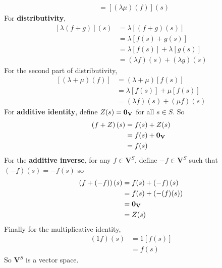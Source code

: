 \begin{solution}
\begin{align*}
    &= \left[ \left( \lambda \mu \right) \left( f \right) \right](s)
   \end{align*}
For \textbf{distributivity}, 
\begin{align*}
  \left[ \lambda \left( f + g \right) \right](s) &= \lambda \left[ \left( f+g \right)(s) \right] \\
  &= \lambda \left[ f(s) + g(s) \right] \\
  &= \lambda \left[ f(s) \right] + \lambda \left[ g(s) \right] \\
  &= \left( \lambda f \right)(s) + \left( \lambda g \right)(s)
\end{align*}
 For the second part of distributivity, 
 \begin{align*}
  \left[ \left( \lambda + \mu \right)(f) \right] &= \left( \lambda + \mu \right) \left[ f(s) \right]\\
  &= \lambda \left[ f(s) \right] + \mu \left[ f(s) \right] \\
  &= \left( \lambda f \right)(s) + \left( \mu f \right)(s)
 \end{align*}
 For \textbf{additive identity}, define \( Z(s) = \vb{0}_{\mathbf{V}} \) for all \( s \in S \). So 
 \begin{align*}
  \left( f+Z \right)(s) &= f(s) + Z(s) \\
  &= f(s) + \vb{0}_{\mathbf{V}}\\
  &= f(s)
 \end{align*}
 For the \textbf{additive inverse}, for any \( f \in \mathbf{V}^{S} \), define \( -f \in \mathbf{V}^{S} \) such that \( \left( -f \right)(s) = -f(s) \) so 
 \begin{align*}
  \left( f + \left( -f \right) \right)(s) &= f(s) + \left( -f \right)(s)\\
  &= f(s) + (-(f)(s))\\
  &= \vb{0}_{\mathbf{V}}\\
  &= Z(s)
 \end{align*}
 Finally for the multiplicative identity, 
 \begin{align*}
  \left( 1 f \right)(s) &= 1 \left[ f(s) \right] \\
  &= f(s)
 \end{align*}
 So \( \mathbf{V}^{S} \) is a vector space.
\end{solution}



